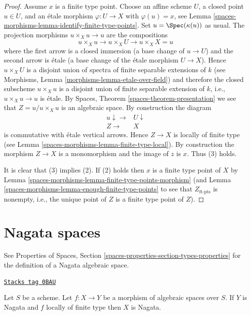 \begin{proof}
Assume $x$ is a finite type point. Choose an affine scheme $U$,
a closed point $u \in U$, and an \'etale morphism $\varphi : U \to X$
with $\varphi(u) = x$, see
Lemma \ref{spaces-morphisms-lemma-identify-finite-type-points}.
Set $u = \Spec(\kappa(u))$ as usual. The projection morphisms
$u \times_X u \to u$ are the compositions
$$
u \times_X u \to u \times_X U \to u \times_X X = u
$$
where the first arrow is a closed immersion (a base change of
$u \to U$) and the second arrow is \'etale (a base change of the \'etale
morphism $U \to X$). Hence $u \times_X U$ is a disjoint union of spectra
of finite separable extensions of $k$ (see
Morphisms, Lemma \ref{morphisms-lemma-etale-over-field})
and therefore the closed subscheme $u \times_X u$ is a disjoint union of
finite separable extension of $k$, i.e., $u \times_X u \to u$ is \'etale. By
Spaces, Theorem \ref{spaces-theorem-presentation}
we see that $Z = u/u \times_X u$ is an algebraic space. By construction
the diagram
$$
\begin{array}{cc}u \downarrow\longrightarrow & U \downarrow \\ Z \longrightarrow & X\end{array}
$$
is commutative with \'etale vertical arrows. Hence $Z \to X$ is locally
of finite type (see
Lemma \ref{spaces-morphisms-lemma-finite-type-local}).
By construction the morphism $Z \to X$ is a monomorphism and
the image of $z$ is $x$. Thus (3) holds.

\medskip\noindent
It is clear that (3) implies (2).
If (2) holds then $x$ is a finite type point of $X$ by
Lemma \ref{spaces-morphisms-lemma-finite-type-points-morphism}
(and
Lemma \ref{spaces-morphisms-lemma-enough-finite-type-points}
to see that $Z_{\text{ft-pts}}$ is nonempty, i.e., the unique point of
$Z$ is a finite type point of $Z$).
\end{proof}

\section{Nagata spaces}
\label{spaces-morphisms-section-nagata}
See Properties of Spaces, Section
\ref{spaces-properties-section-types-properties} for the definition
of a Nagata algebraic space.

\begin{lemma}
\label{spaces-morphisms-lemma-finite-type-nagata}
\href{https://stacks.math.columbia.edu/tag/0BAU}{\texttt{Stacks tag 0BAU}}

Let $S$ be a scheme.
Let $f : X \to Y$ be a morphism of algebraic spaces over $S$.
If $Y$ is Nagata and $f$ locally of finite type then $X$ is Nagata.
\end{lemma}

